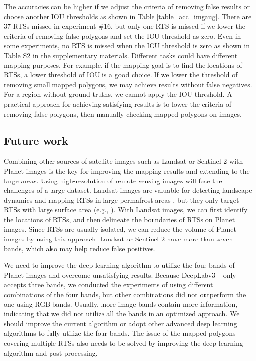 \documentclass[preprint,12pt,authoryear]{elsarticle}
\begin{document}
The accuracies can be higher if we adjust the criteria of removing false results or choose another IOU thresholds as shown in Table \ref{table_acc_imgaug}. There are 37 RTSs missed in experiment \#16, but only one RTS is missed if we lower the criteria of removing false polygons and set the IOU threshold as zero. Even in some experiments, no RTS is missed when the IOU threshold is zero as shown in Table S2 in the supplementary materials. Different tasks could have different mapping purposes. For example, if the mapping goal is to find the locations of RTSs, a lower threshold of IOU is a good choice. If we lower the threshold of removing small mapped polygons, we may achieve results without false negatives. For a region without ground truths, we cannot apply the IOU threshold. A practical approach for achieving satisfying results is to lower the criteria of removing false polygons, then manually checking mapped polygons on images. 


\subsection{Future work}
\label{subsec_future}

Combining other sources of satellite images such as Landsat or Sentinel-2 with Planet images is the key for improving the mapping results and extending to the large areas. Using high-resolution of remote sensing images will face the challenges of a large dataset. Landsat images are valuable for detecting landscape dynamics and mapping RTSs in large permafrost areas \citep{nitze_detection_2016, nitze_landsat-based_2017, nitze2018remote}, but they 
only target RTSs with large surface area (e.g., \citealp{brooker2014investigating}). With Landsat images, we can first identify the locations of RTSs, and then delineate the boundaries of RTSs on Planet images. Since RTSs are usually isolated, we can reduce the volume of Planet images by using this approach.
Landsat or Sentinel-2 have more than seven bands, which also may help reduce false positives. 

We need to improve the deep learning algorithm to utilize the four bands of Planet images and overcome unsatisfying results. Because DeepLabv3+ only accepts three bands, we conducted the experiments of using different combinations of the four bands, but other combinations did not outperform the one using RGB bands. Usually, more image bands contain more information, indicating that we did not utilize all the bands in an optimized approach. We should improve the current algorithm or adopt other advanced deep learning algorithms to fully utilize the four bands.
The issue of the mapped polygons covering multiple RTSs also needs to be solved by improving the deep learning algorithm and post-processing. 
\end{document}
